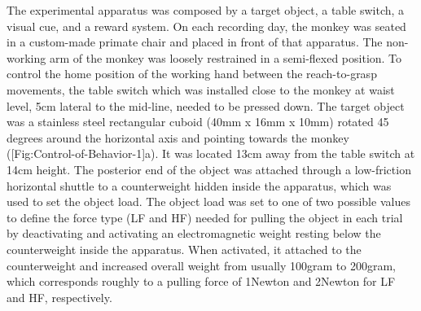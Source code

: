 {The experimental apparatus was composed by a target object, a table switch, a visual cue, and a reward system. On each recording day, the monkey was seated in a custom-made primate chair and placed in front of that apparatus. The non-working arm of the monkey was loosely restrained in a semi-flexed position. To control the home position of the working hand between the reach-to-grasp movements, the table switch which was installed close to the monkey at waist level, 5cm lateral to the mid-line, needed to be pressed down. The target object was a stainless steel rectangular cuboid (40mm x 16mm x 10mm) rotated 45 degrees around the horizontal axis and pointing towards the monkey ([Fig:Control-of-Behavior-1]a). It was located 13cm away from the table switch at 14cm height. The posterior end of the object was attached through a low-friction horizontal shuttle to a counterweight hidden inside the apparatus, which was used to set the object load. The object load was set to one of two possible values to define the force type (LF and HF) needed for pulling the object in each trial by deactivating and activating an electromagnetic weight resting below the counterweight inside the apparatus. When activated, it attached to the counterweight and increased overall weight from usually 100gram to 200gram, which corresponds roughly to a pulling force of 1Newton and 2Newton for LF and HF, respectively. 

}

